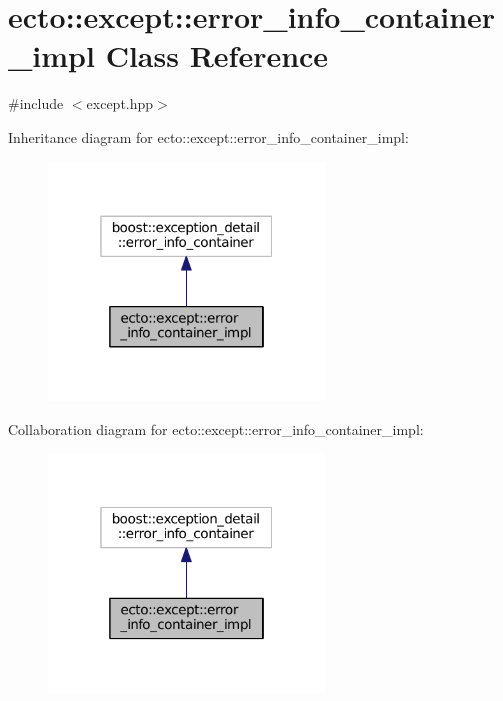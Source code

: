 \hypertarget{classecto_1_1except_1_1error__info__container__impl}{\section{ecto\-:\-:except\-:\-:error\-\_\-info\-\_\-container\-\_\-impl Class Reference}
\label{classecto_1_1except_1_1error__info__container__impl}
}


{\ttfamily \#include $<$except.\-hpp$>$}



Inheritance diagram for ecto\-:\-:except\-:\-:error\-\_\-info\-\_\-container\-\_\-impl\-:\nopagebreak
\begin{figure}[H]
\begin{center}
\leavevmode
\includegraphics[width=208pt]{classecto_1_1except_1_1error__info__container__impl__inherit__graph}
\end{center}
\end{figure}


Collaboration diagram for ecto\-:\-:except\-:\-:error\-\_\-info\-\_\-container\-\_\-impl\-:\nopagebreak
\begin{figure}[H]
\begin{center}
\leavevmode
\includegraphics[width=208pt]{classecto_1_1except_1_1error__info__container__impl__coll__graph}
\end{center}
\end{figure}
